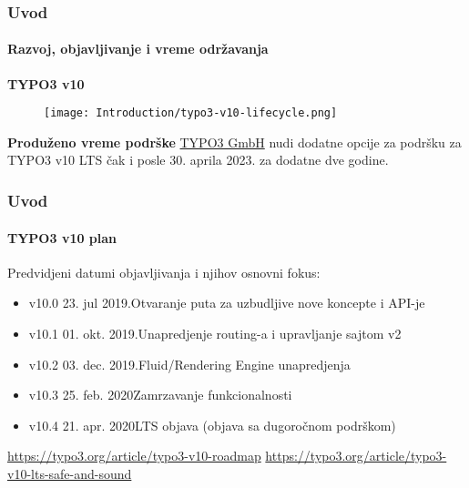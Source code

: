 
\begin{frame}[fragile]
	\frametitle{Uvod}
	\framesubtitle{Razvoj, objavljivanje i vreme održavanja}

	\textbf{TYPO3 v10}

	\begin{figure}
		\texttt{[image: Introduction/typo3-v10-lifecycle.png]}
	\end{figure}

	\textbf{Produženo vreme podrške}\newline
	\smaller
		\href{https://typo3.com}{TYPO3 GmbH} nudi dodatne opcije za podršku za
		TYPO3 v10 LTS čak i posle 30. aprila 2023. za dodatne dve godine.
	\normalsize

\end{frame}


\begin{frame}[fragile]
	\frametitle{Uvod}
	\framesubtitle{TYPO3 v10 plan}

	Predvidjeni datumi objavljivanja i njihov osnovni fokus:

	\begin{itemize}

	\item v10.0 \tabto{1.1cm}23. jul 2019.\tabto{3.4cm}Otvaranje puta za uzbudljive nove koncepte i API-je
	\item v10.1 \tabto{1.1cm}01. okt. 2019.\tabto{3.4cm}Unapredjenje routing-a i upravljanje sajtom v2
	\item v10.2 \tabto{1.1cm}03. dec. 2019.\tabto{3.4cm}Fluid/Rendering Engine unapredjenja
		\item v10.3 \tabto{1.1cm}25. feb. 2020\tabto{3.4cm}Zamrzavanje funkcionalnosti
		\item
			\begingroup
				\color{typo3orange}
				v10.4 \tabto{1.1cm}21. apr. 2020\tabto{3.4cm}LTS objava (objava sa dugoročnom podrškom)
			\endgroup

	\end{itemize}

	\vspace{0.6cm}
	\smaller
		\url{https://typo3.org/article/typo3-v10-roadmap}\newline
		\url{https://typo3.org/article/typo3-v10-lts-safe-and-sound}
	\normalsize

\end{frame}

